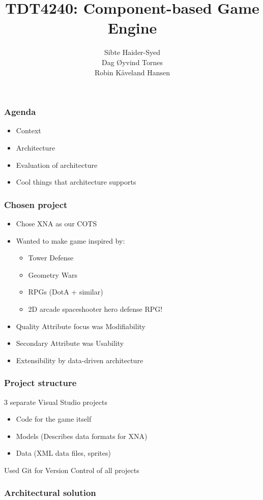 \documentclass[screen]{beamer}
\title{TDT4240: Component-based Game Engine}
\author[finnrobi, sibtehai, tornes]{Sibte Haider-Syed\\
  Dag Øyvind Tornes\\
  Robin Kåveland Hansen}
\date{}
\begin{document}
\ntnutitlepage

\begin{frame}
  \frametitle{Agenda}
  \begin{itemize}
    \item Context
    \item Architecture
    \item Evaluation of architecture
    \item Cool things that architecture supports
  \end{itemize}
\end{frame}

\begin{frame}
  \frametitle{Chosen project}
  \begin{itemize}
    \item Chose XNA as our COTS
    \item Wanted to make game inspired by:
      \begin{itemize}
        \item Tower Defense
        \item Geometry Wars 
        \item RPGs (DotA + similar)
        \item 2D arcade spaceshooter hero defense RPG!
      \end{itemize}
    \item Quality Attribute focus was Modifiability
    \item Secondary Attribute was Usability
    \item Extensibility by data-driven architecture
  \end{itemize}
\end{frame}

\begin{frame}
  \frametitle{Project structure}
  3 separate Visual Studio projects\\
  \begin{itemize}
    \item Code for the game itself
    \item Models (Describes data formats for XNA)
    \item Data (XML data files, sprites)
  \end{itemize}
  Used Git for Version Control of all projects
\end{frame}

\begin{frame}
  \frametitle{Architectural solution}
\end{frame}
\end{document}
